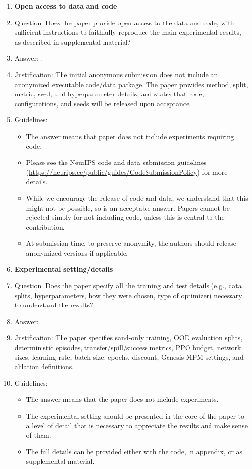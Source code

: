\begin{enumerate}
\item {\bf Open access to data and code}
    \item[] Question: Does the paper provide open access to the data and code, with sufficient instructions to faithfully reproduce the main experimental results, as described in supplemental material?
    \item[] Answer: \answerNo{}.
    \item[] Justification: The initial anonymous submission does not include an anonymized executable code/data package. The paper provides method, split, metric, seed, and hyperparameter details, and states that code, configurations, and seeds will be released upon acceptance.
    \item[] Guidelines:
    \begin{itemize}
        \item The answer \answerNA{} means that paper does not include experiments requiring code.
        \item Please see the NeurIPS code and data submission guidelines (\url{https://neurips.cc/public/guides/CodeSubmissionPolicy}) for more details.
        \item While we encourage the release of code and data, we understand that this might not be possible, so \answerNo{} is an acceptable answer. Papers cannot be rejected simply for not including code, unless this is central to the contribution.
        \item At submission time, to preserve anonymity, the authors should release anonymized versions if applicable.
    \end{itemize}

\item {\bf Experimental setting/details}
    \item[] Question: Does the paper specify all the training and test details (e.g., data splits, hyperparameters, how they were chosen, type of optimizer) necessary to understand the results?
    \item[] Answer: \answerYes{}.
    \item[] Justification: The paper specifies sand-only training, OOD evaluation splits, deterministic episodes, transfer/spill/success metrics, PPO budget, network sizes, learning rate, batch size, epochs, discount, Genesis MPM settings, and ablation definitions.
    \item[] Guidelines:
    \begin{itemize}
        \item The answer \answerNA{} means that the paper does not include experiments.
        \item The experimental setting should be presented in the core of the paper to a level of detail that is necessary to appreciate the results and make sense of them.
        \item The full details can be provided either with the code, in appendix, or as supplemental material.
    \end{itemize}


\end{enumerate}
